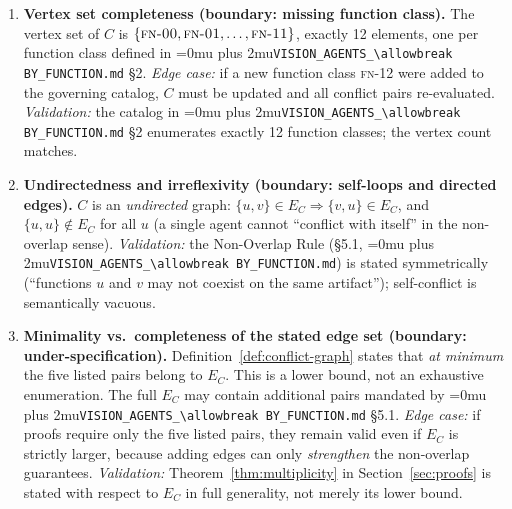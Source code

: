 \documentclass[12pt]{article}
\theoremstyle{definition}
\DeclareRobustCommand{\code}[1]{\begingroup\Urlmuskip=0mu plus 2mu\relax\nolinkurl{#1}\endgroup}
\newcommand{\FN}[1]{\textsc{fn-#1}}
\newcommand{\VisionFunc}{\code{VISION\_AGENTS\_\allowbreak BY\_FUNCTION.md}}
\begin{document}
\begin{enumerate}[label=\textbf{C\arabic*.}, leftmargin=*, widest=C9]

  \item \textbf{Vertex set completeness (boundary: missing function
        class).}
        The vertex set of $C$ is
        $\{\FN{00}, \FN{01}, \ldots, \FN{11}\}$, exactly 12 elements,
        one per function class defined in \VisionFunc{} \S2.
        \emph{Edge case:} if a new function class \FN{12} were added
        to the governing catalog, $C$ must be updated and all conflict
        pairs re-evaluated.
        \emph{Validation:} the catalog in \VisionFunc{} \S2 enumerates
        exactly 12 function classes; the vertex count matches.

  \item \textbf{Undirectedness and irreflexivity (boundary: self-loops
        and directed edges).}
        $C$ is an \emph{undirected} graph:
        $\{u,v\} \in E_C \Rightarrow \{v,u\} \in E_C$, and
        $\{u,u\} \notin E_C$ for all $u$ (a single agent cannot
        ``conflict with itself'' in the non-overlap sense).
        \emph{Validation:} the Non-Overlap Rule (\S5.1, \VisionFunc{})
        is stated symmetrically (``functions $u$ and $v$ may not
        coexist on the same artifact''); self-conflict is
        semantically vacuous.

  \item \textbf{Minimality vs.\ completeness of the stated edge set
        (boundary: under-specification).}
        Definition~\ref{def:conflict-graph} states that
        \emph{at minimum} the five listed pairs belong to $E_C$.
        This is a lower bound, not an exhaustive enumeration.
        The full $E_C$ may contain additional pairs mandated by
        \VisionFunc{} \S5.1.
        \emph{Edge case:} if proofs require only the five listed
        pairs, they remain valid even if $E_C$ is strictly larger,
        because adding edges can only \emph{strengthen} the
        non-overlap guarantees.
        \emph{Validation:} Theorem~\ref{thm:multiplicity} in
        Section~\ref{sec:proofs} is stated with respect to
        $E_C$ in full generality, not merely its lower bound.


\end{enumerate}
\end{document}
